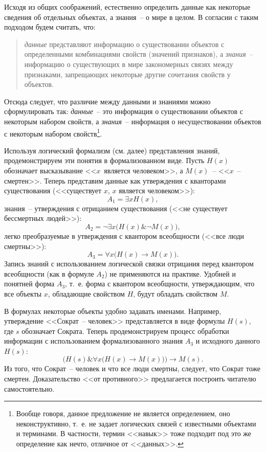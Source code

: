 \documentclass[a4paper,14pt, openany, twoside, final]{extbook} %
\begin{document}
Исходя из общих соображений, естественно определить данные как некоторые сведения об отдельных объектах, а знания~-- о мире в целом. В согласии с таким подходом будем считать, что:
\begin{quote}
{\em данные} представляют информацию о существовании объектов с определенными комбинациями свойств (значений признаков), а {\em знания}~-- информацию о существующих в мире закономерных связях между признаками, запрещающих некоторые другие сочетания свойств у объектов.
\end{quote}

Отсюда следует, что различие между данными и знаниями можно сформулировать так: {\em данные}~-- это информация о существовании объектов с некоторым набором свойств, а {\em знания}~-- информация о несуществовании объектов с некоторым набором свойств\footnote{Вообще говоря, данное предложение не является определением, оно неконструктивно, т.~е. не задает логических связей с известными объектами и терминами. В частности, термин <<навык>> тоже подходит под это же определение как нечто, отличное от <<данных>>.}.

Используя логический формализм (см. далее) представления знаний, продемонстрируем эти понятия в формализованном виде.  Пусть $H(x)$ обозначает высказывание <<$x$~является человеком>>, а $M(x)$~-- <<$x$~-- смертен>>. Теперь представим данные как утверждения с кванторами существования (<<существует $x$, $x$ является человеком>>):
$$
    A_1=\exists x H(x),
$$
знания~-- утверждения с отрицанием существования (<<не существует бессмертных людей>>):
$$
    A_2=\neg\exists x \big ( H(x) \& \neg M(x) \big ),
$$
легко преобразуемые в утверждения с квантором всеобщности (<<все люди смертны>>):
$$
    A_3=\forall x \big ( H(x)\to M(x)\big ).
$$
Запись знаний с использованием логической связки отрицания перед квантором всеобщности (как в формуле $A_2$) не применяются на практике. Удобней и понятней форма $A_3$, т.~е. форма с квантором всеобщности, утверждающим, что все объекты $x$, обладающие свойством $H$, будут обладать свойством $M$.

В формулах некоторые объекты удобно задавать именами.  Например, утверждение <<Сократ~-- человек>> представляется в виде формулы $H(s)$, где $s$ обозначает Сократа.  Теперь продемонстрируем процесс обработки информации с использованием формализованного знания $A_3$ и исходного данного $H(s)$:
$$
\Big (H(s) \& \forall x \big ( H(x)\to M(x)\big ) \Big ) \to M(s).
$$
Из того, что Сократ~-- человек и что все люди смертны, следует, что Сократ тоже смертен.  Доказательство <<от противного>> предлагается построить читателю самостоятельно.
\end{document}
